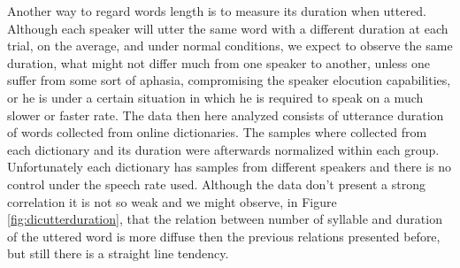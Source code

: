 Another way to regard words length is to measure its duration when uttered.
Although each speaker will utter the same word with a different duration at each
trial, on the average, and under normal conditions, we expect to observe the same
duration, what might not differ much from one speaker to another, unless 
one suffer from some sort of aphasia, compromising the speaker elocution capabilities,
or he is under a certain situation in which he is required to speak on a much slower or 
faster rate. The data then here analyzed consists of utterance duration of words
collected from online dictionaries. The samples where collected from each dictionary and
its duration were afterwards normalized within each group. Unfortunately each dictionary has
samples from different speakers and there is no control under the speech rate used.
Although the data don't present
a strong correlation it is not so weak and we might observe, in Figure \ref{fig:dicutterduration},
that the relation between number of syllable and duration of the uttered word is
more diffuse then the previous relations presented before, but still there is a 
straight line tendency.


